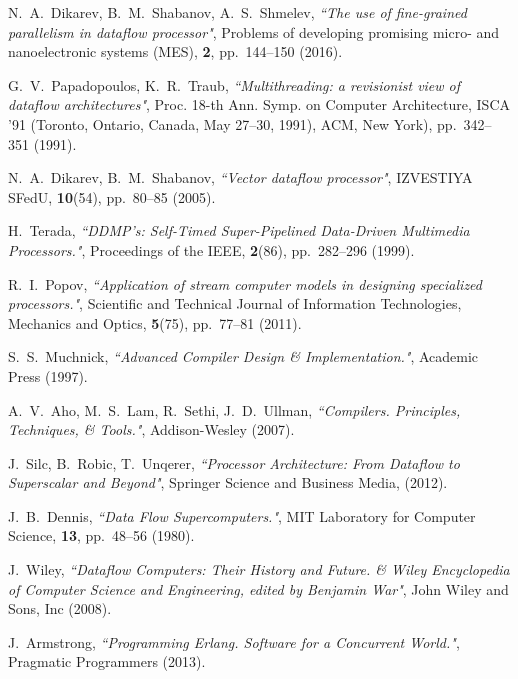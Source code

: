 \documentclass[
11pt,%
tightenlines,%
twoside,%
onecolumn,%
nofloats,%
nobibnotes,%
nofootinbib,%
superscriptaddress,%
noshowpacs,%
centertags]%
{revtex4}
\begin{document}
\begin{thebibliography}{99}

N.~A.~Dikarev, B.~M.~Shabanov, A.~S.~Shmelev, {\it ``The use of fine-grained parallelism in dataflow processor"}, Problems of developing promising micro- and nanoelectronic systems (MES), {\bf 2}, pp.~144--150 (2016).

G.~V.~Papadopoulos, K.~R.~Traub, {\it ``Multithreading: a revisionist view of
dataflow architectures"}, Proc. 18-th Ann. Symp. on Computer Architecture,
ISCA ’91 (Toronto, Ontario, Canada, May 27–30, 1991), ACM, New York), pp.~342--351 (1991).


N.~A.~Dikarev, B.~M.~Shabanov, {\it ``Vector dataflow processor"}, IZVESTIYA SFedU, {\bf 10}(54), pp.~80--85 (2005).


H.~Terada, {\it ``DDMP’s: Self-Timed Super-Pipelined Data-Driven Multimedia Processors."}, Proceedings of the IEEE, {\bf 2}(86), pp.~282--296 (1999).

R.~I.~Popov, {\it ``Application of stream computer models in designing specialized processors."}, Scientific and Technical Journal of Information Technologies, Mechanics and Optics, {\bf 5}(75), pp.~77--81 (2011).


S.~S.~Muchnick, {\it ``Advanced Compiler Design \& Implementation."}, Academic Press (1997).

A.~V.~Aho, M.~S.~Lam, R.~Sethi, J.~D.~Ullman, {\it ``Compilers. Principles, Techniques, \& Tools."}, Addison-Wesley (2007).

J.~Silc, B.~Robic, T.~Unqerer, {\it ``Processor Architecture: From Dataflow to Superscalar and Beyond"}, Springer Science and Business Media, (2012).

J.~B.~Dennis, {\it ``Data Flow Supercomputers."}, MIT Laboratory for Computer Science, {\bf 13}, pp.~48--56 (1980).

J.~Wiley, {\it ``Dataflow Computers: Their History and Future. \& Wiley Encyclopedia of Computer Science and Engineering, edited by Benjamin War"}, John Wiley and Sons, Inc (2008).

J.~Armstrong, {\it ``Programming Erlang. Software for a Concurrent World."}, Pragmatic Programmers (2013).

\end{thebibliography}
\end{document}
